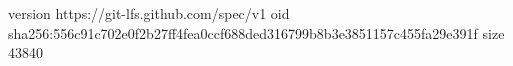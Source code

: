 version https://git-lfs.github.com/spec/v1
oid sha256:556c91c702e0f2b27ff4fea0ccf688ded316799b8b3e3851157c455fa29e391f
size 43840
